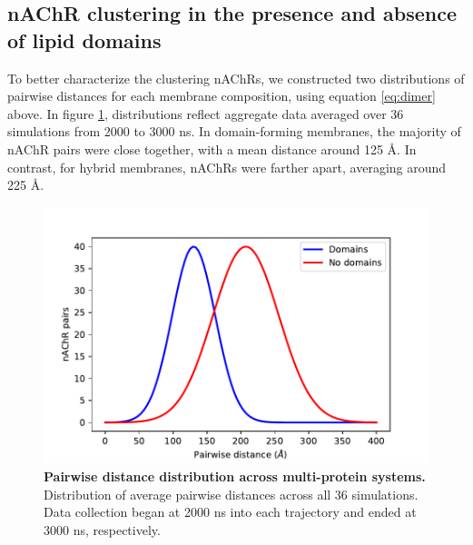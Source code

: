 \documentclass[final,3p,times,twocolumn]{elsarticle}
\begin{document}







\subsection{nAChR clustering in the presence and absence of lipid domains} \label{sec:clustering}
To better characterize the clustering nAChRs, we constructed two distributions of pairwise distances for each membrane composition, using equation \ref{eq:dimer} above. In figure \ref{fig:Figure6}, distributions reflect aggregate data averaged over 36 simulations from 2000 to 3000 ns. In domain-forming membranes, the majority of nAChR pairs were close together, with a mean distance around 125 {\AA}. In contrast, for hybrid membranes, nAChRs were farther apart, averaging around 225 {\AA}.  


\begin{figure}[H]
\centering
\includegraphics[width=\linewidth,trim={0cm 0cm 0cm 0cm}]{Figure2}
\caption[Pairwise distance distribution across multi-protein systems.] {{\bf Pairwise distance distribution across multi-protein systems.} Distribution of average pairwise distances across all 36 simulations. Data collection began at 2000 ns into each trajectory and ended at 3000 ns, respectively. }
\label{fig:Figure6}
\end{figure}
\end{document}
